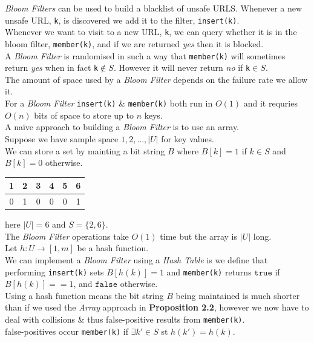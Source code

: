\documentclass[11pt,a4paper]{article}
\begin{document}
\textit{Bloom Filters} can be used to build a blacklist of unsafe URLS. Whenever a new unsafe URL, \lstinline!k!, is discovered we add it to the filter, \lstinline!insert(k)!.\\
Whenever we want to visit to a new URL, \lstinline!k!, we can query whether it is in the bloom filter, \lstinline!member(k)!, and if we are returned \textit{yes} then it is blocked.\\

A \textit{Bloom Filter} is randomised in such a way that \lstinline!member(k)! will sometimes return \textit{yes} when in fact \lstinline!k!$\not\in S$. However it will never return \textit{no} if \lstinline!k!$\in S$.\\
\nb The amount of space used by a \textit{Bloom Filter} depends on the failure rate we allow it.\\

For a \textit{Bloom Filter} \lstinline!insert(k)! \& \lstinline!member(k)! both run in $O(1)$ and it requries $O(n)$ bits of space to store up to $n$ keys.\\

A na\"ive approach to building a \textit{Bloom Filter} is to use an array.\\
Suppose we have sample space $1,2,\dots,|U|$ for key values.\\
We can store a set by mainting a bit string $B$ where $B[k]=1$ if $k\in S$ and $B[k]=0$ otherwise.\\
\eg \begin{tabular}{|c|c|c|c|c|c|}
\hline
1&2&3&4&5&6\\\hline
0&1&0&0&0&1\\\hline
\end{tabular} here $|U|=6$ and $S=\{2,6\}$.\\
The \textit{Bloom Filter} operations take $O(1)$ time but the array is $|U|$ long.\\

Let $h:U\to[1,m]$ be a hash function.\\
We can implement a \textit{Bloom Filter} using a \textit{Hash Table} is we define that performing \lstinline!insert(k)! sets $B[h(k)]=1$ and \lstinline!member(k)! returns $\mathtt{true}$ if $B[h(k)]==1$, and $\mathtt{false}$ otherwise.\\
Using a hash function means the bit string $B$ being maintained is much shorter than if we used the \textit{Array} approach in \textbf{Proposition 2.2}, however we now have to deal with collisions \& thus false-positive results from \lstinline!member(k)!.\\
\nb false-positives occur \lstinline!member(k)! if $\exists k'\in S$ st $h(k')=h(k)$.\\
\end{document}
